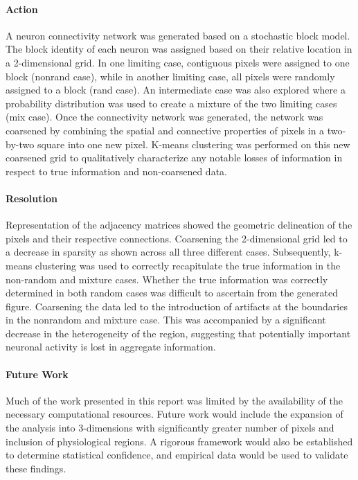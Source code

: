 \documentclass[12pt]{article}
\begin{document}
\paragraph{Action}
A neuron connectivity network was generated based on a stochastic block model.
The block identity of each neuron was assigned based on their relative location
in a 2-dimensional grid. In one limiting case, contiguous pixels were assigned
to one block (nonrand case), while in another limiting case, all pixels were
randomly assigned to a block (rand case). An intermediate case was also
explored where a probability distribution was used to create a mixture of the
two limiting cases (mix case).  Once the connectivity network was generated,
the network was coarsened by combining the spatial and connective properties of
pixels in a two-by-two square into one new pixel. K-means clustering was
performed on this new coarsened grid to qualitatively characterize any notable
losses of information in respect to true information and non-coarsened data.

\paragraph{Resolution}
Representation of the adjacency matrices showed the geometric delineation of
the pixels and their respective connections. Coarsening the 2-dimensional grid
led to a decrease in sparsity as shown across all three different cases.
Subsequently, k-means clustering was used to correctly recapitulate the true
information in the non-random and mixture cases. Whether the true information
was correctly determined in both random cases was difficult to ascertain from
the generated figure. Coarsening the data led to the introduction of artifacts
at the boundaries in the nonrandom and mixture case. This was accompanied by a
significant decrease in the heterogeneity of the region, suggesting that
potentially important neuronal activity is lost in aggregate information.

\paragraph{Future Work}
Much of the work presented in this report was limited by the availability of
the necessary computational resources. Future work would include the expansion
of the analysis into 3-dimensions with significantly greater number of pixels
and inclusion of physiological regions. A rigorous framework would also be
established to determine statistical confidence, and empirical data would be
used to validate these findings.

\newpage



\end{document}
